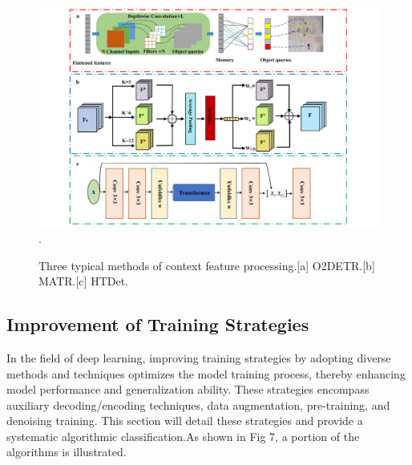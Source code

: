 \documentclass[journal]{IEEEtran}
\begin{document}
\begin{figure}[htbp]
	\centering
	\setlength{\abovecaptionskip}{-0.6cm}
	\includegraphics[width=\textwidth]{fig 6}
	\DeclareGraphicsExtensions.
	\caption{Three typical methods of context feature processing.[a] O2DETR.[b] MATR.[c] HTDet.}
	\label{fig 1}
\end{figure}

\subsection{Improvement of Training Strategies}

In the field of deep learning, improving training strategies by adopting diverse methods and techniques optimizes the model training process, thereby enhancing model performance and generalization ability. These strategies encompass auxiliary decoding/encoding techniques, data augmentation, pre-training, and denoising training. This section will detail these strategies and provide a systematic algorithmic classification.As shown in Fig 7, a portion of the algorithms is illustrated.
\end{document}
